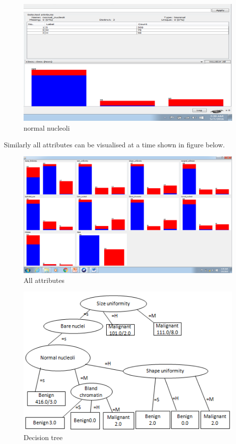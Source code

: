 \documentclass[11pt]{article}
\begin{document}
 
\begin{figure}[!h]
\centering
\includegraphics[scale=0.4]{nucleifig}
\caption{normal nucleoli}
\label{fig_sin}

\end{figure}
Similarly all attributes can be visualised at a time shown in figure below. 
\begin{figure}[!h]
\centering
\includegraphics[scale=0.3]{visuals}
\caption{All attributes}
\label{fig_sin}

\end{figure}



\begin{figure}[!h]
\centering
\includegraphics[scale=0.7]{tree}
\caption{Decision tree}
\label{fig_sin}

\end{figure}
\end{document}
